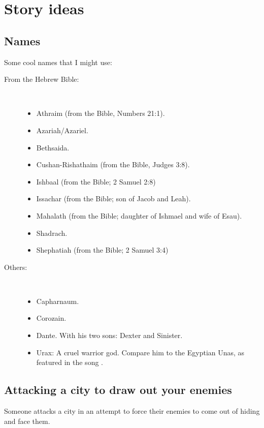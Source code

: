 \section{Story ideas}
\subsection{Names}
Some cool names that I might use:

\begin{description}
  \item[From the Hebrew Bible:]
    \ 
    \begin{itemize}
      \item Athraim (from the Bible, Numbers 21:1).
      \item Azariah/Azariel. 
      \item Bethsaida.
      \item Cushan-Rishathaim (from the Bible, Judges 3:8).
      \item Ishbaal (from the Bible; 2 Samuel 2:8)
      \item Issachar (from the Bible; son of Jacob and Leah).
      \item Mahalath (from the Bible; daughter of Ishmael and wife of Esau). 
      \item Shadrach. 
      \item Shephatiah (from the Bible; 2 Samuel 3:4)
    \end{itemize}
    
  \item[Others:]
    \ 
    \begin{itemize}
      \item Capharnaum.
      \item Corozain.
      \item 
        Dante.
        With his two sons: Dexter and Sinister.
      \item 
        Urax: 
        A cruel warrior god. 
        Compare him to the Egyptian Unas, as featured in the song . 
    \end{itemize}
\end{description}











\subsection{Attacking a city to draw out your enemies}
Someone attacks a city in an attempt to force their enemies to come out of hiding and face them. 

